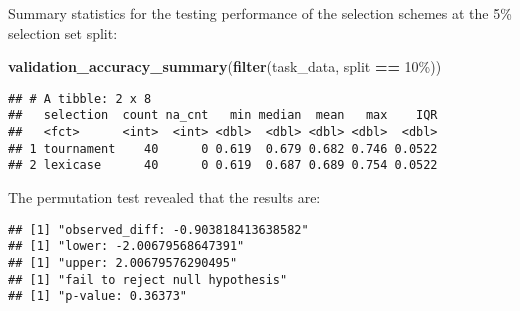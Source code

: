 \documentclass[
]{book}
\newenvironment{Shaded}{\begin{snugshade}}{\end{snugshade}}
\newcommand{\AttributeTok}[1]{\textcolor[rgb]{0.13,0.29,0.53}{#1}}
\newcommand{\DecValTok}[1]{\textcolor[rgb]{0.00,0.00,0.81}{#1}}
\newcommand{\FunctionTok}[1]{\textcolor[rgb]{0.13,0.29,0.53}{\textbf{#1}}}
\newcommand{\NormalTok}[1]{#1}
\newcommand{\OtherTok}[1]{\textcolor[rgb]{0.56,0.35,0.01}{#1}}
\newcommand{\SpecialCharTok}[1]{\textcolor[rgb]{0.81,0.36,0.00}{\textbf{#1}}}
\newcommand{\StringTok}[1]{\textcolor[rgb]{0.31,0.60,0.02}{#1}}
\begin{document}
Summary statistics for the testing performance of the selection schemes at the 5\% selection set split:

\begin{Shaded}
\begin{Highlighting}[]
\FunctionTok{validation\_accuracy\_summary}\NormalTok{(}\FunctionTok{filter}\NormalTok{(task\_data, split }\SpecialCharTok{==} \StringTok{\textquotesingle{}10\%\textquotesingle{}}\NormalTok{))}
\end{Highlighting}
\end{Shaded}

\begin{verbatim}
## # A tibble: 2 x 8
##   selection  count na_cnt   min median  mean   max    IQR
##   <fct>      <int>  <int> <dbl>  <dbl> <dbl> <dbl>  <dbl>
## 1 tournament    40      0 0.619  0.679 0.682 0.746 0.0522
## 2 lexicase      40      0 0.619  0.687 0.689 0.754 0.0522
\end{verbatim}

The permutation test revealed that the results are:

\begin{Shaded}
\end{Shaded}

\begin{verbatim}
## [1] "observed_diff: -0.903818413638582"
## [1] "lower: -2.00679568647391"
## [1] "upper: 2.00679576290495"
## [1] "fail to reject null hypothesis"
## [1] "p-value: 0.36373"
\end{verbatim}
\end{document}
